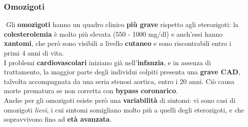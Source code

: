 \documentclass[a4paper, 12pt]{article}
\begin{document}
\begin{titlepage}
\subsubsection{Omozigoti}
 Gli \textbf{omozigoti} hanno un quadro clinico \textbf{più grave} rispetto agli eterozigoti: la \textbf{colesterolemia} è molto più elevata (550 - 1000 mg/dl) e anch’essi hanno \textbf{xantomi}, che però sono visibili a livello \textbf{cutaneo} e sono riscontrabili entro i primi 4 anni di vita.\\
I problemi \textbf{cardiovascolari} iniziano già nell’\textbf{infanzia}, e in assenza di trattamento, la maggior parte degli individui colpiti presenta una \textbf{grave CAD}, talvolta accompagnata da una seria stenosi aortica, entro i 20 anni. Ciò causa morte prematura se non corretta con \textbf{bypass coronarico}.\\
Anche per gli omozigoti esiste però una \textbf{variabilità} di sintomi: vi sono casi di omozigoti \textit{lievi}, i cui sintomi somigliano molto più a quelli degli eterozigoti, e che sopravvivono fino ad \textbf{età avanzata}.


\end{titlepage}
\end{document}
